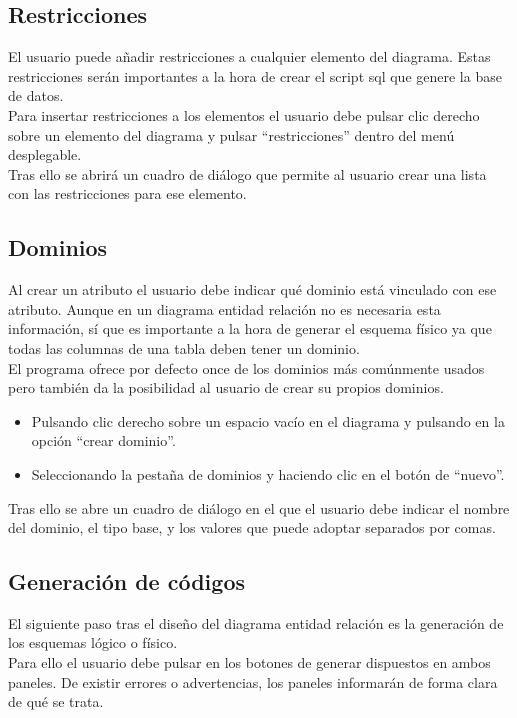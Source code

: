 \subsection*{Restricciones}
El usuario puede añadir restricciones a cualquier elemento del diagrama. Estas restricciones serán importantes a la hora de crear el script sql que genere la base de datos.\\

Para insertar restricciones a los elementos el usuario debe pulsar clic derecho sobre un elemento del diagrama y pulsar \enquote{restricciones} dentro del menú desplegable.\\

Tras ello se abrirá un cuadro de diálogo que permite al usuario crear una lista con las restricciones para ese elemento.

\subsection*{Dominios}
Al crear un atributo el usuario debe indicar qué dominio está vinculado con ese atributo. Aunque en un diagrama entidad relación no es necesaria esta información, sí que es importante a la hora de generar el esquema físico ya que todas las columnas de una tabla deben tener un dominio.\\

El programa ofrece por defecto once de los dominios más comúnmente usados pero también da la posibilidad al usuario de crear su propios dominios.
\begin{itemize}
    \item Pulsando clic derecho sobre un espacio vacío en el diagrama y pulsando en la opción \enquote{crear dominio}.
    \item Seleccionando la pestaña de dominios y haciendo clic en el botón de \enquote{nuevo}.
\end{itemize}
Tras ello se abre un cuadro de diálogo en el que el usuario debe indicar el nombre del dominio, el tipo base, y los valores que puede adoptar separados por comas.
\subsection*{Generación de códigos}
El siguiente paso tras el diseño del diagrama entidad relación es la generación de los esquemas lógico o físico.\\

Para ello el usuario debe pulsar en los botones de generar dispuestos en ambos paneles. De existir errores o advertencias, los paneles informarán de forma clara de qué se trata.\\


